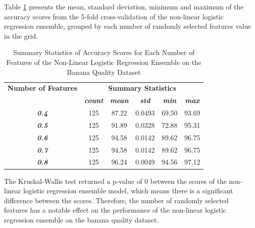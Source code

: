 \documentclass[10pt, conference]{IEEEtran}
\begin{document}
Table \ref{table: BQ_feature_nonlinear_performance_metrics} presents the mean, standard deviation, minimum and maximum of the
accuracy scores from the 5-fold cross-validation of the non-linear logistic regression ensemble, grouped by each number of randomly selected
features value in the grid.
\begin{table}[H]
    \caption{Summary Statistics of Accuracy Scores for Each Number of Features of the Non-Linear Logistic Regression Ensemble on the Banana Quality Dataset}
    \begin{center}
        \begin{tabular}{|c||c|c|c|c|c|}
            \hline
            \textbf{Number of Features}&\multicolumn{5}{|c|}{\textbf{Summary Statistics}} \\
            \cline{2-6}
                                &\textbf{\textit{count}} & \textbf{\textit{mean}} & \textbf{\textit{std}} & \textbf{\textit{min}} & \textbf{\textit{max}}\\
            \hline
            \textbf{\textit{0.4}} & 125 & 87.22 & 0.0493 & 69.50 & 93.69 \\
            \textbf{\textit{0.5}} & 125 & 91.89 & 0.0328 & 72.88 & 95.31 \\
            \textbf{\textit{0.6}} & 125 & 94.58 & 0.0142 & 89.62 & 96.75 \\
            \textbf{\textit{0.7}} & 125 & 94.58 & 0.0142 & 89.62 & 96.75 \\
            \textbf{\textit{0.8}} & 125 & 96.24 & 0.0049 & 94.56 & 97.12 \\
            \hline
        \end{tabular}
    \end{center}
    \label{table: BQ_feature_nonlinear_performance_metrics}
\end{table}
The Kruskal-Wallis test returned a p-value of 0 between the scores of the non-linear logistic regression ensemble model,
which means there is a significant difference between the scores. Therefore, the number of randomly selected
features has a notable effect on the performance of the non-linear logistic regression ensemble on the banana quality dataset.
\end{document}
